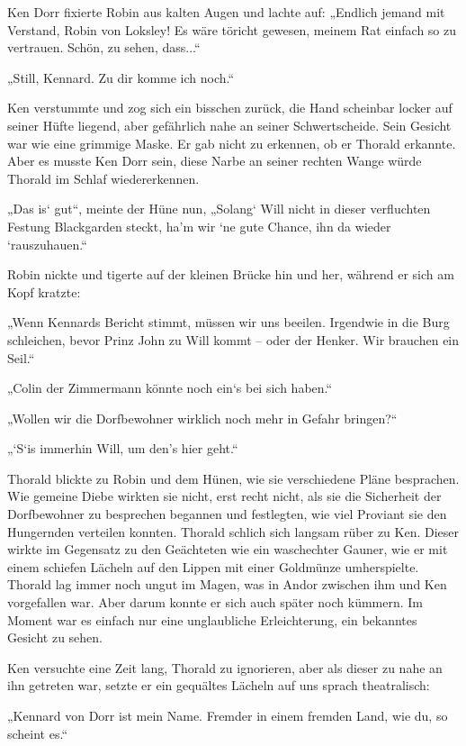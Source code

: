 \documentclass[10pt, a4paper, oneside]{book}
\begin{document}
Ken Dorr fixierte Robin aus kalten Augen und lachte auf: „Endlich jemand mit Verstand, Robin von Loksley! Es wäre töricht gewesen, meinem Rat einfach so zu vertrauen. Schön, zu sehen, dass...“

„Still, Kennard. Zu dir komme ich noch.“

Ken verstummte und zog sich ein bisschen zurück, die Hand scheinbar locker auf seiner Hüfte liegend, aber gefährlich nahe an seiner Schwertscheide. Sein Gesicht war wie eine grimmige Maske. Er gab nicht zu erkennen, ob er Thorald erkannte. Aber es musste Ken Dorr sein, diese Narbe an seiner rechten Wange würde Thorald im Schlaf wiedererkennen.

„Das is‘ gut“, meinte der Hüne nun, „Solang‘ Will nicht in dieser verfluchten Festung Blackgarden steckt, ha’m wir ‘ne gute Chance, ihn da wieder ‘rauszuhauen.“

Robin nickte und tigerte auf der kleinen Brücke hin und her, während er sich am Kopf kratzte:

„Wenn Kennards Bericht stimmt, müssen wir uns beeilen. Irgendwie in die Burg schleichen, bevor Prinz John zu Will kommt – oder der Henker. Wir brauchen ein Seil.“

„Colin der Zimmermann könnte noch ein‘s bei sich haben.“

„Wollen wir die Dorfbewohner wirklich noch mehr in Gefahr bringen?“

„‘S‘is immerhin Will, um den’s hier geht.“

Thorald blickte zu Robin und dem Hünen, wie sie verschiedene Pläne besprachen. Wie gemeine Diebe wirkten sie nicht, erst recht nicht, als sie die Sicherheit der Dorfbewohner zu besprechen begannen und festlegten, wie viel Proviant sie den Hungernden verteilen konnten. Thorald schlich sich langsam rüber zu Ken. Dieser wirkte im Gegensatz zu den Geächteten wie ein waschechter Gauner, wie er mit einem schiefen Lächeln auf den Lippen mit einer Goldmünze umherspielte. Thorald lag immer noch ungut im Magen, was in Andor zwischen ihm und Ken vorgefallen war. Aber darum konnte er sich auch später noch kümmern. Im Moment war es einfach nur eine unglaubliche Erleichterung, ein bekanntes Gesicht zu sehen.

Ken versuchte eine Zeit lang, Thorald zu ignorieren, aber als dieser zu nahe an ihn getreten war, setzte er ein gequältes Lächeln auf uns sprach theatralisch:

„Kennard von Dorr ist mein Name. Fremder in einem fremden Land, wie du, so scheint es.“
\end{document}
